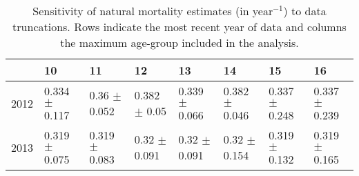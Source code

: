 \begin{sidewaystable}[ht]
\centering
\begin{tabular}{rlllllll}
  \hline
 & 10 & 11 & 12 & 13 & 14 & 15 & 16 \\ 
  \hline
2012 & 0.334 $\pm$ 0.117 & 0.36 $\pm$ 0.052 & 0.382 $\pm$ 0.05 & 0.339 $\pm$ 0.066 & 0.382 $\pm$ 0.046 & 0.337 $\pm$ 0.248 & 0.337 $\pm$ 0.239 \\ 
  2013 & 0.319 $\pm$ 0.075 & 0.319 $\pm$ 0.083 & 0.32 $\pm$ 0.091 & 0.32 $\pm$ 0.091 & 0.32 $\pm$ 0.154 & 0.319 $\pm$ 0.132 & 0.319 $\pm$ 0.165 \\ 
   \hline
\end{tabular}
\caption{Sensitivity of natural mortality estimates (in year$^{-1}$) to data truncations. Rows indicate the most recent year of data and columns the maximum age-group included in the analysis.} 
\label{tab:Sensitivity-NaturalMortalityToMulletDataTruncation}
\end{sidewaystable}
